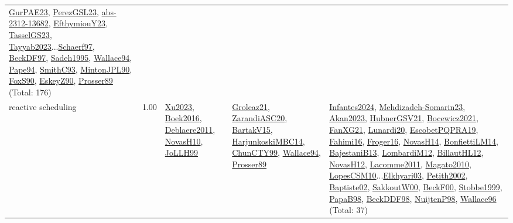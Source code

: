 {\begin{longtable}{p{3cm}r>{\raggedright\arraybackslash}p{6cm}>{\raggedright\arraybackslash}p{6cm}>{\raggedright\arraybackslash}p{8cm}}
\hyperref[detail:GurPAE23]{GurPAE23}, \hyperref[detail:PerezGSL23]{PerezGSL23}, \hyperref[detail:abs-2312-13682]{abs-2312-13682}, \hyperref[detail:EfthymiouY23]{EfthymiouY23}, \hyperref[detail:TasselGS23]{TasselGS23}, \hyperref[detail:Tayyab2023]{Tayyab2023}...\hyperref[detail:Schaerf97]{Schaerf97}, \hyperref[detail:BeckDF97]{BeckDF97}, \hyperref[detail:Sadeh1995]{Sadeh1995}, \hyperref[detail:Wallace94]{Wallace94}, \hyperref[detail:Pape94]{Pape94}, \hyperref[detail:SmithC93]{SmithC93}, \hyperref[detail:MintonJPL90]{MintonJPL90}, \hyperref[detail:FoxS90]{FoxS90}, \hyperref[detail:EskeyZ90]{EskeyZ90}, \hyperref[detail:Prosser89]{Prosser89} (Total: 176)\\
\index{reactive scheduling}\index{Concepts!reactive scheduling}reactive scheduling &  1.00 & \hyperref[detail:Xu2023]{Xu2023}, \hyperref[detail:Boek2016]{Boek2016}, \hyperref[detail:Deblaere2011]{Deblaere2011}, \hyperref[detail:NovasH10]{NovasH10}, \hyperref[detail:JoLLH99]{JoLLH99} & \hyperref[detail:Groleaz21]{Groleaz21}, \hyperref[detail:ZarandiASC20]{ZarandiASC20}, \hyperref[detail:BartakV15]{BartakV15}, \hyperref[detail:HarjunkoskiMBC14]{HarjunkoskiMBC14}, \hyperref[detail:ChunCTY99]{ChunCTY99}, \hyperref[detail:Wallace94]{Wallace94}, \hyperref[detail:Prosser89]{Prosser89} & \hyperref[detail:Infantes2024]{Infantes2024}, \hyperref[detail:Mehdizadeh-Somarin23]{Mehdizadeh-Somarin23}, \hyperref[detail:Akan2023]{Akan2023}, \hyperref[detail:HubnerGSV21]{HubnerGSV21}, \hyperref[detail:Bocewicz2021]{Bocewicz2021}, \hyperref[detail:FanXG21]{FanXG21}, \hyperref[detail:Lunardi20]{Lunardi20}, \hyperref[detail:EscobetPQPRA19]{EscobetPQPRA19}, \hyperref[detail:Fahimi16]{Fahimi16}, \hyperref[detail:Froger16]{Froger16}, \hyperref[detail:NovasH14]{NovasH14}, \hyperref[detail:BonfiettiLM14]{BonfiettiLM14}, \hyperref[detail:BajestaniB13]{BajestaniB13}, \hyperref[detail:LombardiM12]{LombardiM12}, \hyperref[detail:BillautHL12]{BillautHL12}, \hyperref[detail:NovasH12]{NovasH12}, \hyperref[detail:Lacomme2011]{Lacomme2011}, \hyperref[detail:Magato2010]{Magato2010}, \hyperref[detail:LopesCSM10]{LopesCSM10}...\hyperref[detail:Elkhyari03]{Elkhyari03}, \hyperref[detail:Petith2002]{Petith2002}, \hyperref[detail:Baptiste02]{Baptiste02}, \hyperref[detail:SakkoutW00]{SakkoutW00}, \hyperref[detail:BeckF00]{BeckF00}, \hyperref[detail:Stobbe1999]{Stobbe1999}, \hyperref[detail:PapaB98]{PapaB98}, \hyperref[detail:BeckDDF98]{BeckDDF98}, \hyperref[detail:NuijtenP98]{NuijtenP98}, \hyperref[detail:Wallace96]{Wallace96} (Total: 37)\\

\end{longtable}}

